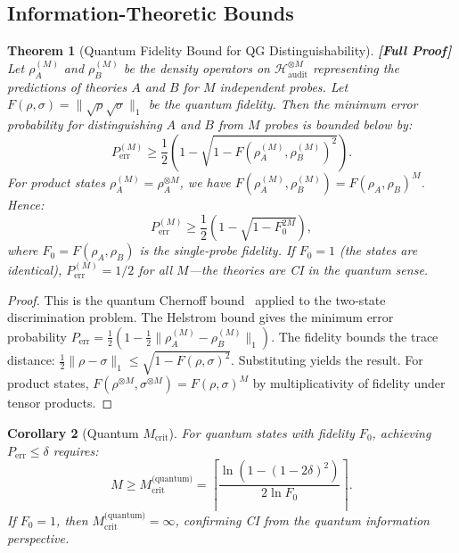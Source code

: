\documentclass[12pt,a4paper]{article}
\newtheorem{theorem}{Theorem}[section]
\newtheorem{corollary}[theorem]{Corollary}
\theoremstyle{remark}
\newcommand{\Hilb}{\mathcal{H}}
\newcommand{\CI}{\textsf{CI}}
\newcommand{\rigorFull}{\textbf{[Full Proof]}}
\begin{document}
\subsection{Information-Theoretic Bounds}

\begin{theorem}[Quantum Fidelity Bound for QG Distinguishability]
\label{thm:fidelity_bound}
\rigorFull
Let $\rho_A^{(M)}$ and $\rho_B^{(M)}$ be the density operators on $\Hilb_{\text{audit}}^{\otimes M}$ representing the predictions of theories $A$ and $B$ for $M$ independent probes. Let $F(\rho, \sigma) = \|\sqrt{\rho}\sqrt{\sigma}\|_1$ be the quantum fidelity. Then the minimum error probability for distinguishing $A$ and $B$ from $M$ probes is bounded below by:
\begin{equation}
  \label{eq:quantum_bound}
  P_{\text{err}}^{(M)} \geq \frac{1}{2}\left(1 - \sqrt{1 - F(\rho_A^{(M)}, \rho_B^{(M)})^2}\right).
\end{equation}
For product states $\rho_A^{(M)} = \rho_A^{\otimes M}$, we have $F(\rho_A^{(M)}, \rho_B^{(M)}) = F(\rho_A, \rho_B)^M$. Hence:
\begin{equation}
  P_{\text{err}}^{(M)} \geq \frac{1}{2}\left(1 - \sqrt{1 - F_0^{2M}}\right),
\end{equation}
where $F_0 = F(\rho_A, \rho_B)$ is the single-probe fidelity. If $F_0 = 1$ (the states are identical), $P_{\text{err}}^{(M)} = 1/2$ for all $M$---the theories are \CI{} in the quantum sense.
\end{theorem}

\begin{proof}
This is the quantum Chernoff bound~\cite{audenaert2007quantum} applied to the two-state discrimination problem. The Helstrom bound gives the minimum error probability $P_{\text{err}} = \frac{1}{2}(1 - \frac{1}{2}\|\rho_A^{(M)} - \rho_B^{(M)}\|_1)$. The fidelity bounds the trace distance: $\frac{1}{2}\|\rho - \sigma\|_1 \leq \sqrt{1 - F(\rho, \sigma)^2}$. Substituting yields the result. For product states, $F(\rho^{\otimes M}, \sigma^{\otimes M}) = F(\rho, \sigma)^M$ by multiplicativity of fidelity under tensor products.
\end{proof}

\begin{corollary}[Quantum $M_{\text{crit}}$]
\label{cor:quantum_mcrit}
For quantum states with fidelity $F_0$, achieving $P_{\text{err}} \leq \delta$ requires:
\begin{equation}
  M \geq M_{\text{crit}}^{\text{(quantum)}} = \left\lceil
  \frac{\ln(1 - (1-2\delta)^2)}{2\ln F_0}
  \right\rceil.
\end{equation}
If $F_0 = 1$, then $M_{\text{crit}}^{\text{(quantum)}} = \infty$, confirming \CI{} from the quantum information perspective.
\end{corollary}
\end{document}
